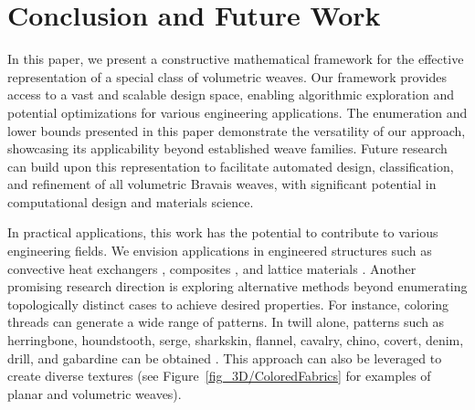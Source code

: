 \documentclass[unnumsec,webpdf,contemporary,large]{oup-authoring-template}%
\theoremstyle{thmstyleone}%
\theoremstyle{thmstyletwo}%
\theoremstyle{thmstylethree}%
\begin{document}
\section{Conclusion and Future Work}

In this paper, we present a constructive mathematical framework for the effective representation of a special class of volumetric weaves. Our framework provides access to a vast and scalable design space, enabling algorithmic exploration and potential optimizations for various engineering applications. The enumeration and lower bounds presented in this paper demonstrate the versatility of our approach, showcasing its applicability beyond established weave families. Future research can build upon this representation to facilitate automated design, classification, and refinement of all volumetric Bravais weaves, with significant potential in computational design and materials science.


In practical applications, this work has the potential to contribute to various engineering fields. We envision applications in engineered structures such as convective heat exchangers \cite{avila2017}, composites \cite{Li2009, GEREKE2019}, and lattice materials \cite{salari2018}. Another promising research direction is exploring alternative methods beyond enumerating topologically distinct cases to achieve desired properties. For instance, coloring threads can generate a wide range of patterns. In twill alone, patterns such as herringbone, houndstooth, serge, sharkskin, flannel, cavalry, chino, covert, denim, drill, and gabardine can be obtained \cite{feijs2012houndstooth}. This approach can also be leveraged to create diverse textures \cite{Windeknecht1980, Windeknecht1994, feijs2012houndstooth} (see Figure~\ref{fig_3D/ColoredFabrics} for examples of planar and volumetric weaves).
\end{document}
